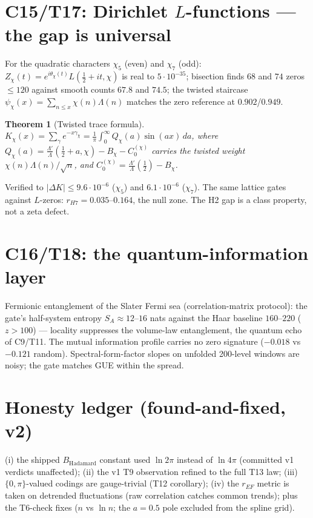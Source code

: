\documentclass[11pt]{article}
\newtheorem{theorem}{Theorem}
\theoremstyle{definition}
\begin{document}
\section{C15/T17: Dirichlet $L$-functions — the gap is universal}
For the quadratic characters $\chi_5$ (even) and $\chi_7$ (odd):
$Z_\chi(t) = e^{i\theta_\chi(t)}L(\tfrac12{+}it,\chi)$ is real to
$5\cdot10^{-35}$; bisection finds $68$ and $74$ zeros $\le 120$ against
smooth counts $67.8$ and $74.5$; the twisted staircase
$\psi_\chi(x) = \sum_{n\le x}\chi(n)\Lambda(n)$ matches the zero reference
at $0.902$/$0.949$.
\begin{theorem}[Twisted trace formula]
$K_\chi(x) = \sum_\gamma e^{-x\gamma_\chi} = \frac{1}{\pi}\int_0^\infty
Q_\chi(a)\sin(ax)\,da$, where $Q_\chi(a) = \frac{\Lambda'}{\Lambda}
(\tfrac12{+}a,\chi) - B_\chi - C_0^{(\chi)}$ carries the twisted weight
$\chi(n)\Lambda(n)/\sqrt{n}$, and $C_0^{(\chi)} =
\frac{\Lambda'}{\Lambda}(\tfrac12) - B_\chi$.
\end{theorem}
Verified to $|\Delta K| \le 9.6\cdot10^{-6}$ ($\chi_5$) and
$6.1\cdot10^{-6}$ ($\chi_7$). The same lattice gates against $L$-zeros:
$r_{H7} = 0.035$--$0.164$, the null zone. The H2 gap is a class property,
not a zeta defect.

\section{C16/T18: the quantum-information layer}
Fermionic entanglement of the Slater Fermi sea (correlation-matrix
protocol): the gate's half-system entropy $S_A \approx 12$--$16$ nats
against the Haar baseline $160$--$220$ ($z>100$) --- locality suppresses
the volume-law entanglement, the quantum echo of C9/T11. The mutual
information profile carries no zero signature ($-0.018$ vs $-0.121$
random). Spectral-form-factor slopes on unfolded 200-level windows are
noisy; the gate matches GUE within the spread.

\section{Honesty ledger (found-and-fixed, v2)}
(i) the shipped $B_{\mathrm{Hadamard}}$ constant used $\ln 2\pi$ instead
of $\ln 4\pi$ (committed v1 verdicts unaffected);
(ii) the v1 T9 observation refined to the full T13 law;
(iii) $\{0,\pi\}$-valued codings are gauge-trivial (T12 corollary);
(iv) the $r_{EF}$ metric is taken on detrended fluctuations (raw
correlation catches common trends); plus the T6-check fixes ($n$ vs
$\ln n$; the $a=0.5$ pole excluded from the spline grid).
\end{document}
